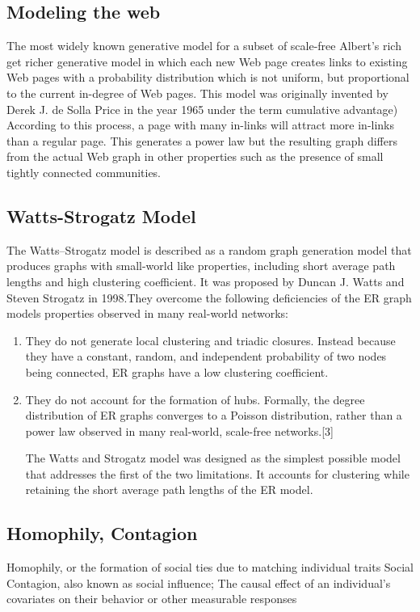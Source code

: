 \subsection{Modeling the web}
The most widely known generative model for a subset of scale-free Albert's rich get richer generative model in which each new Web page creates links to existing Web pages with a probability distribution which is not uniform, but proportional to the current in-degree of Web pages. This model was originally invented by Derek J. de Solla Price in the year 1965 under the term cumulative advantage) According to this process, a page with many in-links will attract more in-links than a regular page. This generates a power law but the resulting graph differs from the actual Web graph in other properties such as the presence of small tightly connected communities.  

\subsection{Watts-Strogatz Model}
The Watts–Strogatz model is described as a random graph generation model that produces graphs with small-world like properties, including short average path lengths and high clustering coefficient. It was proposed by Duncan J. Watts and Steven Strogatz in 1998.They overcome the following deficiencies of the ER graph models properties observed in many real-world networks:
\begin{enumerate}
\item They do not generate local clustering and triadic closures. Instead because they have a constant, random, and independent probability of two nodes being connected, ER graphs have a low clustering coefficient.
\item They do not account for the formation of hubs. Formally, the degree distribution of ER graphs converges to a Poisson distribution, rather than a power law observed in many real-world, scale-free networks.[3]


The Watts and Strogatz model was designed as the simplest possible model that addresses the first of the two limitations. It accounts for clustering while retaining the short average path lengths of the ER model.
\end{enumerate}
\subsection{Homophily, Contagion}

Homophily, or the formation of social ties due to matching individual traits
 Social Contagion, also known as social influence;
 The causal effect of an individual's covariates on their behavior or other measurable responses

